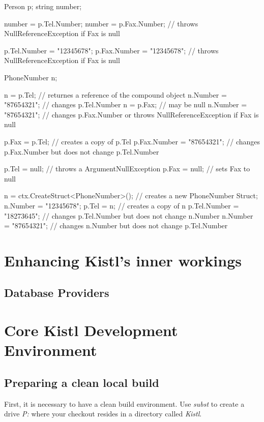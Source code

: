 \begin{CS}
Person p;
string number;

number = p.Tel.Number;
number = p.Fax.Number; // throws NullReferenceException if Fax is null

p.Tel.Number = "12345678";
p.Fax.Number = "12345678"; // throws NullReferenceException if Fax is null

PhoneNumber n;

n = p.Tel; // returnes a reference of the compound object
n.Number = "87654321"; // changes p.Tel.Number
n = p.Fax; // may be null
n.Number = "87654321"; // changes p.Fax.Number or throws NullReferenceException if Fax is null

p.Fax = p.Tel; // creates a copy of p.Tel
p.Fax.Number = "87654321"; // changes p.Fax.Number but does not change p.Tel.Number

p.Tel = null; // throws a ArgumentNullException
p.Fax = null; // sets Fax to null

n = ctx.CreateStruct<PhoneNumber>(); // creates a new PhoneNumber Struct;
n.Number = "12345678";
p.Tel = n; // creates a copy of n
p.Tel.Number = "18273645"; // changes p.Tel.Number but does not change n.Number
n.Number = "87654321"; // changes n.Number but does not change p.Tel.Number
\end{CS}

\section{Enhancing Kistl's inner workings}

\subsection{Database Providers}



\section{Core Kistl Development Environment}

\subsection{Preparing a clean local build}

First, it is necessary to have a clean build environment. Use
\emph{subst} to create a drive \emph{P:} where your checkout
resides in a directory called \emph{Kistl}.

